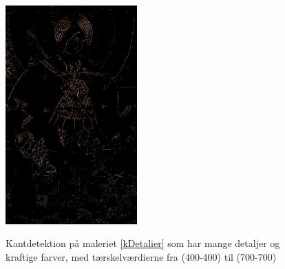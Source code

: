 \begin{figure}[!h]
{        \includegraphics[angle=0,width=0.45\textwidth]{afsnit/afprovning/billeder/thressholds/krafitige_farver/krafite_detalier/1_iteration/600-600.png}
        \label{600-600}}
    \caption[]{Kantdetektion på maleriet \ref{kDetalier} som har mange detaljer og kraftige farver, med tærskelværdierne fra (400-400) til (700-700)}
     \label{allesammen2}
\end{figure}

